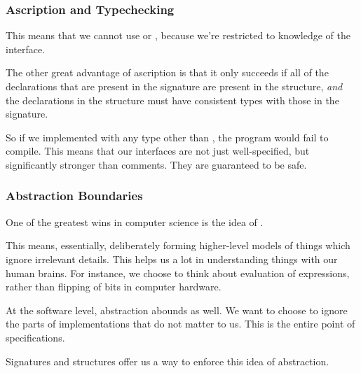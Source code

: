 \documentclass[aspectratio=169]{beamer}
\begin{document}
\begin{frame}[fragile]
  \frametitle{Ascription and Typechecking}

  \tgs

  This means that we cannot use  or ,
  because we're restricted to knowledge of the interface.

  \pause
  \vspace{\fill}

  The other great advantage of ascription is that it only succeeds if
  all of the declarations that are present in the signature are present in
  the structure, \textit{and} the declarations in the structure must have
  consistent types with those in the signature.

  \pause
  \vspace{\fill}

  So if we implemented  with any type other than
  , the program would
  fail to compile. This means that our interfaces are not just well-specified,
  but significantly stronger than comments. They are guaranteed to be safe.
\end{frame}


\begin{frame}[fragile]
  \frametitle{Abstraction Boundaries}

  One of the greatest wins in computer science is the idea of .

  \pause
  \vspace{\fill}

  This means, essentially, deliberately forming higher-level models of things which
  ignore irrelevant details. This helps us a lot in understanding things with our
  human brains. For instance, we choose to think about evaluation of expressions,
  rather than flipping of bits in computer hardware.

  \pause
  \vspace{\fill}

  At the software level, abstraction abounds as well. We want to choose to
  ignore the parts of implementations that do not matter to us. This is the
  entire point of specifications.

  \pause
  \vspace{\fill}

  Signatures and structures offer us a way to enforce this idea of abstraction.
\end{frame}
\end{document}
